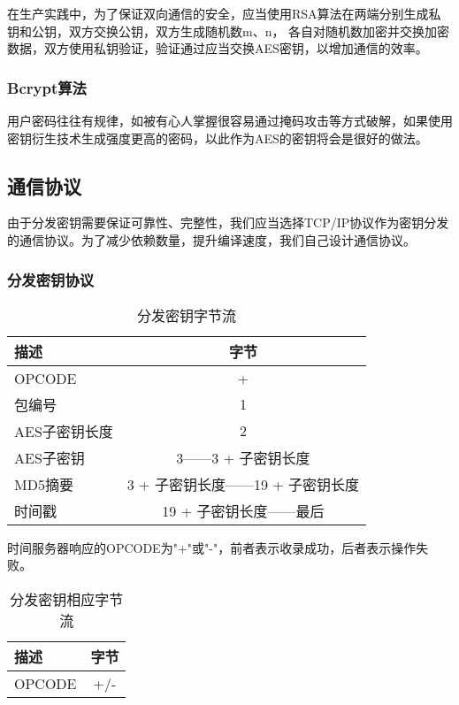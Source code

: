 \documentclass{ctexart}
\begin{document}
在生产实践中，为了保证双向通信的安全，应当使用RSA算法在两端分别生成私钥和公钥，双方交换公钥，双方生成随机数m、n，
各自对随机数加密并交换加密数据，双方使用私钥验证，验证通过应当交换AES密钥，以增加通信的效率。

\subsubsection{Bcrypt算法}

用户密码往往有规律，如被有心人掌握很容易通过掩码攻击等方式破解，如果使用密钥衍生技术生成强度更高的密码，以此作为AES的密钥将会是很好的做法。

\subsection{通信协议}

由于分发密钥需要保证可靠性、完整性，我们应当选择TCP/IP协议作为密钥分发的通信协议。为了减少依赖数量，提升编译速度，我们自己设计通信协议。

\newpage
\subsubsection{分发密钥协议}

\begin{table}[htbp]
\centering
\caption{分发密钥字节流}
\label{tab:byte_stream}
\begin{tabular}{lc}
\toprule
\textbf{描述} & \textbf{字节} \\
\midrule
OPCODE & + \\
包编号 & 1 \\
AES子密钥长度 & 2 \\
AES子密钥 & 3——3 + 子密钥长度 \\
MD5摘要 & 3 + 子密钥长度——19 + 子密钥长度 \\
时间戳 & 19 + 子密钥长度——最后 \\
\bottomrule
\end{tabular}
\end{table}

时间服务器响应的OPCODE为"+"或"-"，前者表示收录成功，后者表示操作失败。

\begin{table}[htbp]
\centering
\caption{分发密钥相应字节流}
\label{tab:byte_stream}
\begin{tabular}{lc}
\toprule
\textbf{描述} & \textbf{字节} \\
\midrule
OPCODE & +/- \\
\bottomrule
\end{tabular}
\end{table}
\end{document}
